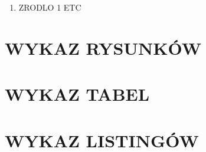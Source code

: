 \documentclass[10pt, a4paper]{report}
\begin{document}
\begin{enumerate}
    \item ZRODLO 1 ETC
\end{enumerate}

\newpage
{}
\section*{WYKAZ RYSUNKÓW}



\newpage
{}
\section*{WYKAZ TABEL}

\newpage
{}
\section*{WYKAZ LISTINGÓW}
\end{document}
